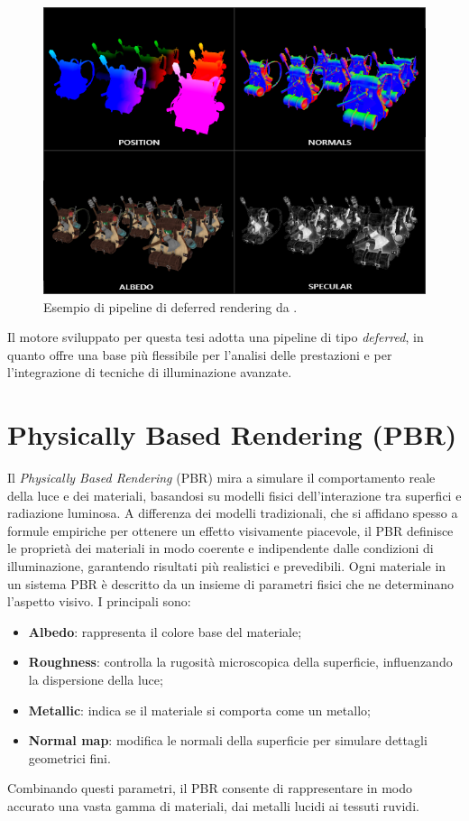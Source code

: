 \documentclass[12pt,a4paper,openright,twoside]{book}
\begin{document}
\begin{figure}[h!]
    \centering
    \includegraphics[width=.8\linewidth]{figures/g_buffer_example.png}
    \caption{Esempio di pipeline di deferred rendering da \cite{learnopengl}.}
    \label{fig:deferred-pipeline}
\end{figure}
Il motore sviluppato per questa tesi adotta una pipeline di tipo \emph{deferred}, in quanto offre una base più
flessibile per l’analisi delle prestazioni e per l’integrazione di tecniche di illuminazione avanzate.

\section{Physically Based Rendering (PBR)}
Il \emph{Physically Based Rendering} (PBR) mira a simulare il comportamento reale della luce e dei materiali,
basandosi su modelli fisici dell’interazione tra superfici e radiazione luminosa. A differenza dei modelli
tradizionali, che si affidano spesso a formule empiriche per ottenere un effetto visivamente piacevole, il PBR
definisce le proprietà dei materiali in modo coerente e indipendente dalle condizioni di illuminazione,
garantendo risultati più realistici e prevedibili.
Ogni materiale in un sistema PBR è descritto da un insieme di parametri fisici che ne determinano l’aspetto visivo.
I principali sono:
\begin{itemize}
    \item \textbf{Albedo}: rappresenta il colore base del materiale;
    \item \textbf{Roughness}: controlla la rugosità microscopica della superficie, influenzando la dispersione della luce;
    \item \textbf{Metallic}: indica se il materiale si comporta come un metallo;
    \item \textbf{Normal map}: modifica le normali della superficie per simulare dettagli geometrici fini.
\end{itemize}
Combinando questi parametri, il PBR consente di rappresentare in modo accurato una vasta gamma di materiali,
dai metalli lucidi ai tessuti ruvidi.
\end{document}
